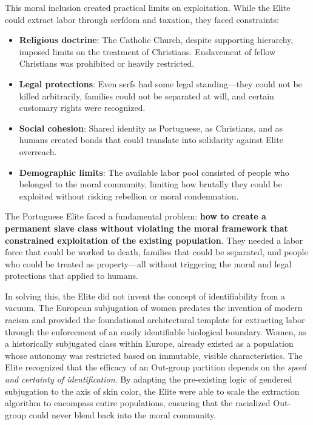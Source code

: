 \documentclass[12pt]{article}
\begin{document}
This moral inclusion created practical limits on exploitation. While the Elite could extract labor through serfdom and taxation, they faced constraints:
\begin{itemize}
    \item \textbf{Religious doctrine}: The Catholic Church, despite supporting hierarchy, imposed limits on the treatment of Christians. Enslavement of fellow Christians was prohibited or heavily restricted.
    \item \textbf{Legal protections}: Even serfs had some legal standing---they could not be killed arbitrarily, families could not be separated at will, and certain customary rights were recognized.
    \item \textbf{Social cohesion}: Shared identity as Portuguese, as Christians, and as humans created bonds that could translate into solidarity against Elite overreach.
    \item \textbf{Demographic limits}: The available labor pool consisted of people who belonged to the moral community, limiting how brutally they could be exploited without risking rebellion or moral condemnation.
\end{itemize}

The Portuguese Elite faced a fundamental problem: \textbf{how to create a permanent slave class without violating the moral framework that constrained exploitation of the existing population}. They needed a labor force that could be worked to death, families that could be separated, and people who could be treated as property---all without triggering the moral and legal protections that applied to humans.

In solving this, the Elite did not invent the concept of identifiability from a vacuum. The European subjugation of women predates the invention of modern racism and provided the foundational architectural template for extracting labor through the enforcement of an easily identifiable biological boundary. Women, as a historically subjugated class within Europe, already existed as a population whose autonomy was restricted based on immutable, visible characteristics. The Elite recognized that the efficacy of an Out-group partition depends on the \textit{speed and certainty of identification}. By adapting the pre-existing logic of gendered subjugation to the axis of skin color, the Elite were able to scale the extraction algorithm to encompass entire populations, ensuring that the racialized Out-group could never blend back into the moral community.
\end{document}
